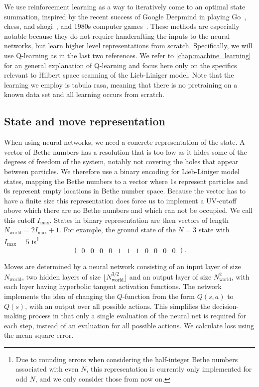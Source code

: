 \documentclass[11pt, a4paper]{report} %
\begin{document}
We use reinforcement learning as a way to iteratively come to an optimal state summation, inspired by the recent success of Google Deepmind in playing Go~\cite{silver16_master_game_go_with_deep,Silver2017a}, chess, and shogi~\cite{Silver2017}, and 1980s computer games~\cite{mnih13_playin_atari_with_deep_reinf_learn,mnih15_human_level_contr_throug_deep_reinf_learn}.
These methods are especially notable because they do not require handcrafting the inputs to the neural networks, but learn higher level representations from scratch.
Specifically, we will use Q-learning as in the last two references.
We refer to \cref{chap:machine_learning} for an general explanation of Q-learning and focus here only on the specifics relevant to Hilbert space scanning of the Lieb-Liniger model.
Note that the learning we employ is tabula rasa, meaning that there is no pretraining on a known data set and all learning occurs from scratch.

\subsection{State and move representation}

When using neural networks, we need a concrete representation of the state.
A vector of Bethe numbers has a resolution that is too low as it hides some of the degrees of freedom of the system, notably not covering the holes that appear between particles.
We therefore use a binary encoding for Lieb-Liniger model states, mapping the Bethe numbers to a vector where 1s represent particles and 0s represent empty locations in Bethe number space.
Because the vector has to have a finite size this representation does force us to implement a UV-cutoff above which there are no Bethe numbers and which can not be occupied.
We call this cutoff \(I_{\max}\).
States in binary representation are then vectors of length $N_{\textrm{world}} = 2 I_{\max} + 1$.
For example, the ground state of the $N=3$ state with $I_{\max} = 5$ is\footnote{Due to rounding errors when considering the half-integer Bethe numbers associated with even \(N\), this representation is currently only implemented for odd \(N\), and we only consider those from now on.}
\begin{equation}
  \label{eq:representation}
  \begin{pmatrix} 0 & 0 & 0 & 0 & 1 & 1 & 1 & 0 & 0 & 0 & 0 \end{pmatrix}.
\end{equation}

Moves are determined by a neural network consisting of an input layer of size \(N_{\textrm{world}}\), two hidden layers of size \(\lfloor N_{\textrm{world}}^{3/2}\rfloor\) and an output layer of size \(N_{\textrm{world}}^2\), with each layer having hyperbolic tangent activation functions.
The network implements the idea of changing the \(Q\)-function from the form \(Q(s,a)\) to \(Q(s)\), with an output over all possible actions\cite{mnih15_human_level_contr_throug_deep_reinf_learn,mnih13_playin_atari_with_deep_reinf_learn}.
This simplifies the decision-making process in that only a single evaluation of the neural net is required for each step, instead of an evaluation for all possible actions.
We calculate loss using the mean-square error.
\end{document}
